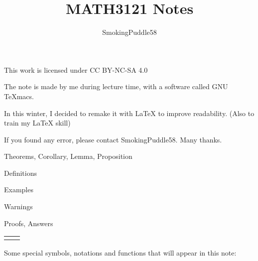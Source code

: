 \documentclass{article}
\title{MATH3121 Notes}
\author{SmokingPuddle58}
\theoremstyle{MyNonumberplain}
\theoremstyle{break}
\theoremstyle{break}
\theoremstyle{break}
\theoremstyle{definition}
\theoremstyle{break}
\begin{document}
\maketitle

\begin{center}
    This work is licensed under CC BY-NC-SA 4.0
\end{center}


\newpage


    The note is made by me during lecture time, with a software called GNU TeXmacs.

    In this winter, I decided to remake it with LaTeX to improve readability. (Also to train my LaTeX skill)

    If you found any error, please contact SmokingPuddle58. Many thanks.\\


\begin{thmbox}
    Theorems, Corollary, Lemma, Proposition
\end{thmbox}

\begin{defbox}
    Definitions
\end{defbox}

\begin{expbox}
    Examples
\end{expbox}

\begin{warnbox}
    Warnings
\end{warnbox}

\begin{prfbox}
    Proofs, Answers
\end{prfbox}

\begin{tabular}{ll}
    &\\
\end{tabular}

Some special symbols, notations and functions that will appear in this note:\\
\end{document}
